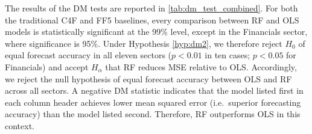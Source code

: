 The results of the DM tests are reported in \cref{tab:dm_test_combined}. For both the traditional C4F and FF5 baselines, every comparison between RF and OLS models is statistically significant at the 99\% level, except in the Financials sector, where significance is 95\%. Under Hypothesis \ref{hyp:dm2}, we therefore reject $H_{0}$ of equal forecast accuracy in all eleven sectors ($p<0.01$ in ten cases; $p<0.05$ for Financials) and accept $H_{\alpha}$ that RF reduces MSE relative to OLS.  Accordingly, we reject the null hypothesis of equal forecast accuracy between OLS and RF across all sectors.  A negative DM statistic indicates that the model listed first in each column header achieves lower mean squared error (i.e.\ superior forecasting accuracy) than the model listed second. Therefore, RF outperforms OLS in this context.

